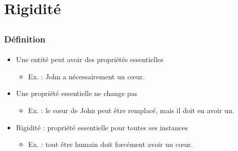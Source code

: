 \documentclass[draft]{beamer}
\begin{document}
\section{Rigidité}
\subsection{}

\begin{frame}
\frametitle{Définition}
\framesubtitle{\cite{goos_ontological_2000,staab_overview_2004}}
\begin{itemize}
 \item Une entité peut avoir des propriétés essentielles
 \begin{itemize}
  \item Ex. : John a nécessairement un cœur.
 \end{itemize}
 \item Une propriété essentielle ne change pas
 \begin{itemize}
  \item Ex. : le cœur de John peut être remplacé, mais il doit en avoir un.
 \end{itemize}
 \item Rigidité : propriété essentielle pour toutes ses instances
 \begin{itemize}
  \item Ex. : tout être humain doit forcément avoir un cœur.
 \end{itemize}
\end{itemize}
\end{frame}
\end{document}
